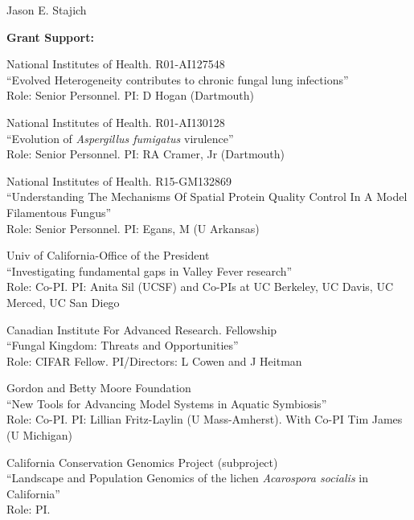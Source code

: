 \documentclass[10pt]{article}
\begin{document}
\begin{cv}{\centerline{Jason E. Stajich}}
\begin{cvlistcompact}{\bf Grant Support:}
\item [{\bf Ongoing support}]

\item [2017-2026] National Institutes of Health. R01-AI127548 \\
``Evolved Heterogeneity contributes to chronic fungal lung infections'' \\
Role: Senior Personnel. PI: D Hogan (Dartmouth)

\item [2017-2022] National Institutes of Health. R01-AI130128 \\
  ``Evolution of \textit{Aspergillus fumigatus} virulence'' \\
Role: Senior Personnel. PI: RA Cramer, Jr (Dartmouth)

\item [2019-2022] National Institutes of Health. R15-GM132869 \\
  ``Understanding The Mechanisms Of Spatial Protein Quality Control In
  A Model Filamentous Fungus'' \\
Role: Senior Personnel. PI: Egans, M (U Arkansas)

\item [2019-2022] Univ of California-Office of the President \\
``Investigating fundamental gaps in Valley Fever research'' \\
Role: Co-PI.  PI: Anita Sil (UCSF) and Co-PIs at UC Berkeley, UC
Davis, UC Merced, UC San Diego

\item [2019-2025] Canadian Institute For Advanced Research. Fellowship \\
  ``Fungal Kingdom: Threats and Opportunities'' \\
Role: CIFAR Fellow. PI/Directors: L Cowen and J Heitman

\item [2020-2023] Gordon and Betty Moore Foundation \\
  ``New Tools for Advancing Model Systems in Aquatic Symbiosis''  \\
Role: Co-PI. PI: Lillian Fritz-Laylin (U Mass-Amherst). With Co-PI Tim James (U Michigan)

\item [2020-2022] California Conservation Genomics Project (subproject) \\
  ``Landscape and Population Genomics of the lichen \textit{Acarospora socialis} in California''  \\
Role: PI.


\end{cvlistcompact}
\end{cv}
\end{document}
